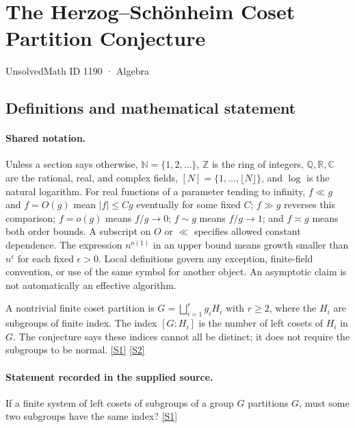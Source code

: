 \documentclass[11pt,a4paper]{article}
\newcommand{\N}{\mathbb{N}}
\newcommand{\Z}{\mathbb{Z}}
\newcommand{\Q}{\mathbb{Q}}
\newcommand{\R}{\mathbb{R}}
\newcommand{\C}{\mathbb{C}}
\newcommand{\sref}[2]{\hyperlink{source:#1:#2}{[S#2]}}
\begin{document}

\setcounter{section}{1189}

\section{The Herzog--Schönheim Coset Partition Conjecture}\label{1190}

{\small\sffamily UnsolvedMath ID 1190 · Algebra}

\subsection{Definitions and mathematical statement}

\paragraph{Shared notation.}Unless a section says otherwise, $\N=\{1,2,\ldots\}$,
$\Z$ is the ring of integers, $\Q,\R,\C$ are the rational, real, and complex
fields, $[N]=\{1,\ldots,\lfloor N\rfloor\}$, and $\log$ is the natural
logarithm. For real functions of a parameter tending to infinity,
$f\ll g$ and $f=O(g)$ mean $|f|\leq Cg$ eventually for some fixed $C$;
$f\gg g$ reverses this comparison; $f=o(g)$ means $f/g\to0$;
$f\sim g$ means $f/g\to1$; and $f\asymp g$ means both order bounds.
A subscript on $O$ or $\ll$ specifies allowed constant dependence.
The expression $n^{o(1)}$ in an upper bound means growth smaller than
$n^\epsilon$ for each fixed $\epsilon>0$. Local definitions govern any
exception, finite-field convention, or use of the same symbol for another
object. An asymptotic claim is not automatically an effective algorithm.



A nontrivial finite coset partition is $G=\bigsqcup_{i=1}^{r}g_iH_i$ with $r\geq2$, where the $H_i$ are subgroups of finite index. The index $[G:H_i]$ is the number of left cosets of $H_i$ in $G$. The conjecture says these indices cannot all be distinct; it does not require the subgroups to be normal. \sref{1190}{1} \sref{1190}{2}

\paragraph{Statement recorded in the supplied source.}
If a finite system of left cosets of subgroups of a group $G$ partitions $G$, must some two subgroups have the same index? \sref{1190}{1}
\end{document}
